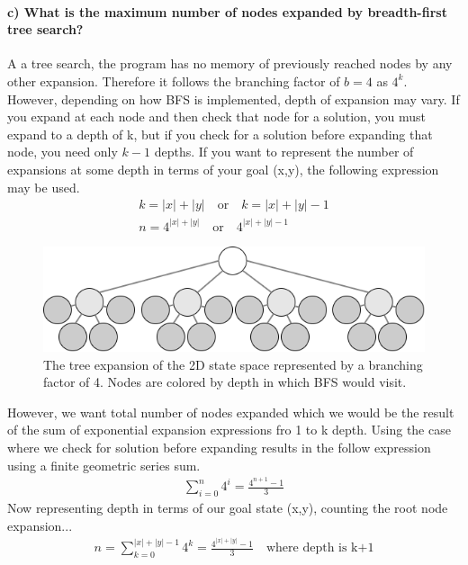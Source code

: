\documentclass[12pt]{article}
\begin{document}
\paragraph{c) What is the maximum number of nodes expanded by breadth-first tree search?}
A a tree search, the program has no memory of previously reached nodes by any other expansion. Therefore it follows the branching factor of $b = 4$ as $4^k$. However, depending on how BFS is implemented, depth of expansion may vary. If you expand at each node and then check that node for a solution, you must expand to a depth of k, but if you check for a solution before expanding that node, you need only $k-1$ depths. If you want to represent the number of expansions at some depth in terms of your goal (x,y), the following expression may be used.
\begin{align}
k = |x| + |y| \quad \text{or} \quad k = |x| + |y| -1\\
n = 4^{|x| + |y|} \quad \text{or} \quad 4^{|x| + |y| -1}
\end{align}
\begin{figure}[ht]
\begin{center}
\includegraphics[scale=.65]{part_c}
\caption{The tree expansion of the 2D state space represented by a branching factor of 4. Nodes are colored by depth in which BFS would visit.}
\end{center}
\end{figure}
However, we want total number of nodes expanded which we would be the result of the sum of exponential expansion expressions fro 1 to k depth. Using the case where we check for solution before expanding results in the follow expression using a finite geometric series sum.
\begin{align}
\sum_{i=0}^{n} 4^i = \frac{4^{n+1}-1}{3}
\end{align}
Now representing depth in terms of our goal state (x,y), counting the root node expansion...
\begin{align}
n = \sum_{k=0}^{|x|+|y| - 1} 4^k= \frac{4^{|x|+|y|}-1}{3} \quad \text{where depth is k+1}
\end{align}
\end{document}
